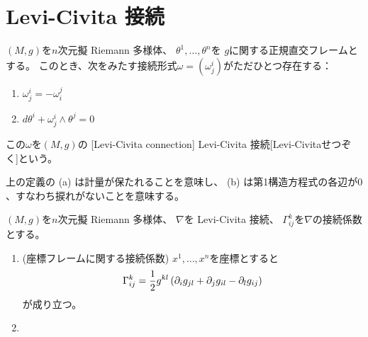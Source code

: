 \documentclass[report]{jlreq}
\begin{document}
\TODO{}

%
\section{Levi-Civita 接続}


\begin{definition}
    $(M, g)$を$n$次元擬 Riemann 多様体、
    $\theta^1, \dots, \theta^n$を
    $g$に関する正規直交フレームとする。
    このとき、次をみたす接続形式$\omega = (\omega_j^i)$がただひとつ存在する：
    \begin{enumerate}[label=(\alph*)]
        \item $\omega_j^i = - \omega_i^j$
        \item $d\theta^i + \omega_j^i \wedge \theta^j = 0$
    \end{enumerate}
    この$\omega$を$(M, g)$の
    [Levi-Civita connection]
        {Levi-Civita 接続}[Levi-Civitaせつぞく]という。
\end{definition}

\begin{remark}
    上の定義の (a) は計量が保たれることを意味し、
    (b) は第1構造方程式の各辺が$0$、すなわち捩れがないことを意味する。
\end{remark}

\begin{proposition}
    $(M, g)$を$n$次元擬 Riemann 多様体、
    $\nabla$を Levi-Civita 接続、
    $\Gamma_{ij}^k$を$\nabla$の接続係数とする。
    \begin{enumerate}
        \item (座標フレームに関する接続係数)
            $x^1, \dots, x^n$を座標とすると
            \begin{equation}
                \Gamma_{ij}^k
                    = \frac{1}{2} g^{kl}
                    \left({
                        \partial_i g_{jl}
                        + \partial_j g_{il}
                        - \partial_l g_{ij}
                    }\right)
            \end{equation}
            が成り立つ。
        \item \TODO{}
    \end{enumerate}
\end{proposition}
\end{document}
